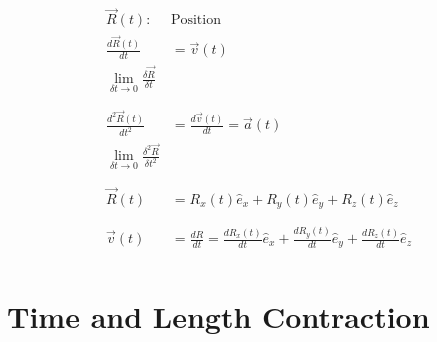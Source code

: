 \documentclass[12pt]{article}
\begin{document}
\begin{align*}
	\overrightarrow{R}(t):                 & \text{Position}                                                                                                 \\
	\frac{d \overrightarrow{R}(t)}{dt}     & = \overrightarrow{v}(t)                                                                                         \\
	\lim_{\delta t \to 0} \frac{\delta \overrightarrow{R}}{\delta t}                                                                                         \\
	\phantom{=}                                                                                                                                              \\
	\frac{d^2 \overrightarrow{R}(t)}{dt^2} & = \frac{d \overrightarrow{v}(t)}{dt} = \overrightarrow{a}(t)                                                    \\
	\lim_{\delta t \to 0} \frac{\delta^2 \overrightarrow{R}}{\delta t^2}                                                                                     \\
	\phantom{=}                                                                                                                                              \\
	\overrightarrow{R}(t)                  & = R_x(t) \hat{e}_x + R_y(t) \hat{e}_y + R_z(t) \hat{e}_z                                                        \\
	\phantom{=}                                                                                                                                              \\
	\overrightarrow{v}(t)                  & = \frac{dR}{dt} = \frac{d R_x(t)}{dt} \hat{e}_x + \frac{d R_y(t)}{dt} \hat{e}_y + \frac{d R_z(t)}{dt} \hat{e}_z \\
\end{align*}

\section{Time and Length Contraction}
\end{document}
